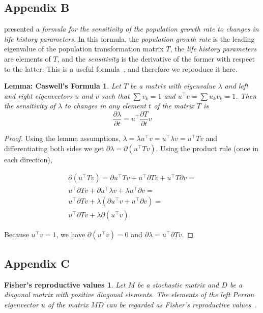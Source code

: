 \documentclass[9pt, a4paper, twocolumn]{extarticle}   	%
\newcommand*{\tr}{^\intercal}
\newtheorem*{caswell}{Lemma: Caswell's Formula}
\newtheorem*{frv}{Fisher's reproductive values}
\begin{document}
\subsection*{Appendix B}\label{sec:AppB}

\citet{Caswell1978} presented a \emph{formula for the sensitivity of the population growth rate to changes in life history parameters}.
In this formula, the \emph{population growth rate} is the leading eigenvalue of the population transformation matrix $T$, the \emph{life history parameters} are elements of $T$, and the \emph{sensitivity} is the derivative of the former with respect to the latter.
This is a useful formula~\citep{Hermisson2002,Ram2012}, and therefore we reproduce it here.

\begin{caswell}
Let $T$ be a matrix with eigenvalue $\lambda$ and left and right eigenvectors $u$ and $v$ such that $\sum{v_k}=1$ and $u\tr v = \sum{u_k v_k} = 1$.
Then the sensitivity of $\lambda$ to changes in any element $t$ of the matrix $T$ is
\begin{equation}\label{eq:Caswells_formula}
\frac{\partial \lambda}{\partial t} = 
u\tr \frac{\partial T}{\partial t} v
\end{equation}
\end{caswell}

\begin{proof} 
Using the lemma assumptions,
$\lambda = \lambda u\tr v = u\tr \lambda v = u\tr T v$ and differentiating both sides we get $\partial \lambda = \partial (u\tr T v)$.
Using the product rule (once in each direction),

\begin{multline}
\partial (u\tr T v) = 
\partial u\tr T v + u\tr \partial T v + u\tr T \partial v = \\
u\tr \partial T v + \partial u\tr \lambda v  + \lambda u\tr \partial v = \\
u\tr \partial T v + \lambda(\partial u\tr v  + u\tr \partial v) = \\
u\tr \partial T v + \lambda \partial(u\tr v).
\end{multline}

Because $u\tr v = 1$,
we have $\partial (u\tr v) = 0$ and
$\partial \lambda = u\tr \partial T v$.
\end{proof}

\subsection*{Appendix C}\label{sec:AppC}
\begin{frv}
Let $M$ be a stochastic matrix and $D$ be a diagonal matrix with positive diagonal elements. 
The elements of the left \emph{Perron} eigenvector $u$ of the matrix $MD$ can be regarded as \emph{Fisher's reproductive values}~\citep{Fisher1930,Grafen2006}.
\end{frv}
\end{document}
